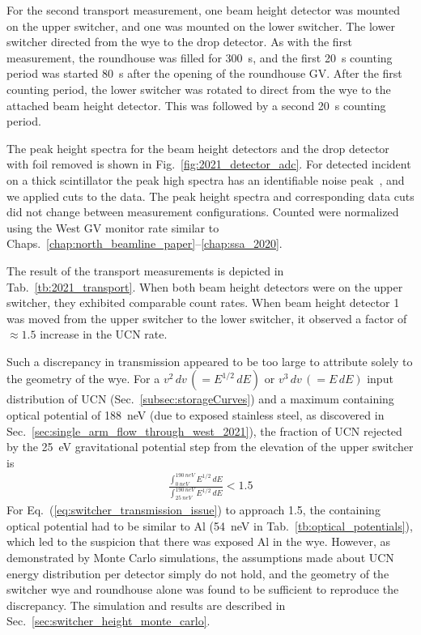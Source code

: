 For the second \ucn transport measurement, one beam height detector was mounted on the upper switcher, and one was mounted on the lower switcher. The lower switcher directed \ucn from the wye to the drop detector. As with the first measurement, the roundhouse was filled for \qty{300}{s}, and the first \qty{20}{s} counting period was started \qty{80}{s} after the opening of the roundhouse GV. After the first counting period, the lower switcher was rotated to direct \ucn from the wye to the attached beam height detector. This was followed by a second \qty{20}{s} counting period.

The peak height spectra for the beam height detectors and the drop detector with foil removed is shown in Fig.~\ref{fig:2021_detector_adc}. For detected \ucn incident on a thick \BZnS scintillator the peak high spectra has an identifiable noise peak~\cite{jeph_multilayer_2015}, and we applied cuts to the data. The peak height spectra and corresponding data cuts did not change between measurement configurations. Counted \ucn were normalized using the West GV monitor rate similar to Chaps.~\ref{chap:north_beamline_paper}--\ref{chap:ssa_2020}. 

The result of the transport measurements is depicted in Tab.~\ref{tb:2021_transport}. When both beam height detectors were on the upper switcher, they exhibited comparable count rates. When beam height detector 1 was moved from the upper switcher to the lower switcher, it observed a factor of $\approx 1.5$ increase in the UCN rate. 

Such a discrepancy in transmission appeared to be too large to attribute solely to the geometry of the wye. For a $v^2\,dv\,(=E^{1/2}\,dE)$ or $v^3\,dv\,(=E\,dE)$ input distribution of UCN (Sec.~\ref{subsec:storageCurves}) and a maximum containing optical potential of \qty{188}{\nano\eV} (due to exposed stainless steel, as discovered in Sec.~\ref{sec:single_arm_flow_through_west_2021}), the fraction of UCN rejected by the \qty{25}{\eV} gravitational potential step from the elevation of the upper switcher is
%
\begin{gather}
    \frac{\int_{\qty{0}{neV}}^{\qty{190}{neV}}E^{1/2}\,dE}{\int_{\qty{25}{neV}}^{\qty{190}{neV}}E^{1/2}\,dE} < 1.5 \label{eq:switcher_transmission_issue}
\end{gather}
%
For Eq.~(\ref{eq:switcher_transmission_issue}) to approach 1.5, the containing optical potential had to be similar to Al (\qty{54}{\nano\eV} in Tab.~\ref{tb:optical_potentials}), which led to the suspicion that there was exposed Al in the wye. However, as demonstrated by Monte Carlo simulations, the assumptions made about UCN energy distribution per detector simply do not hold, and the geometry of the switcher wye and roundhouse alone was found to be sufficient to reproduce the discrepancy. The simulation and results are described in Sec.~\ref{sec:switcher_height_monte_carlo}.


